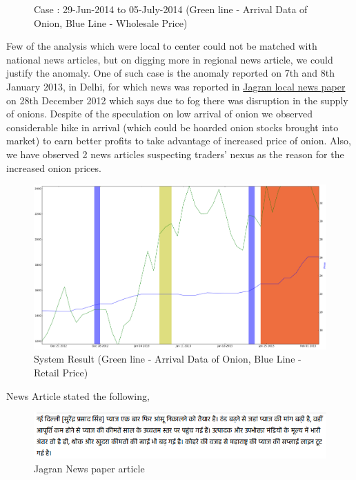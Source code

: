 \begin{itemize}
\begin{figure}[H]
      \caption{Case : 29-Jun-2014 to 05-July-2014 (Green line - Arrival Data of Onion, Blue Line - Wholesale Price)}
      \label{fig:Delhi_WSvsArrival_ill1}
      \end{figure}
\end{itemize}


Few of the analysis which were local to center could not be matched with national news articles, but on digging more in regional news article, we could justify the anomaly. One of such case is the anomaly reported on 7th and 8th January 2013, in Delhi, for which news was reported in \href{http://www.jagran.com/news/business-onion-price-affected-from-fog-9987751.html}{Jagran local news paper} on 28th December 2012 which says due to fog there was disruption in the supply of onions. Despite of the speculation on low arrival of onion we observed considerable hike in arrival (which could be hoarded onion stocks brought into market) to earn better profits to take advantage of increased price of onion. Also, we have observed 2 news articles suspecting traders' nexus as the reason for the increased onion prices.


			\begin{figure}[H]
		    	\centering
  		    	\includegraphics[width=1.1\textwidth]{graphs/localDelhiRegionalNewsPlusNexus.png}
		    	\caption{System Result (Green line - Arrival Data of Onion, Blue Line - Retail Price)}
		    	\label{fig:localExample}
			\end{figure}
			
News Article stated the following,

		\begin{figure}[H]
		    	\centering
  		    	\includegraphics[width=1.1\textwidth]{graphs/localDelhiFog.png}
		    	\caption{Jagran News paper article}
		    	\label{fig:localDelhiFog}
		\end{figure}
		

